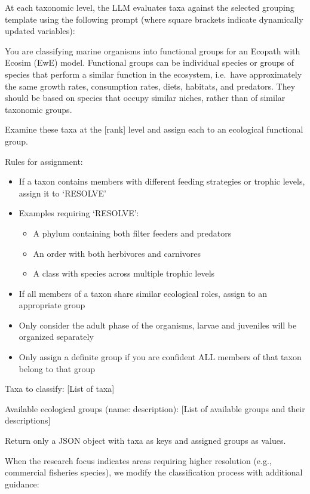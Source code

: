 At each taxonomic level, the LLM evaluates taxa against the selected grouping template using the following prompt (where square brackets indicate dynamically updated variables):

\begin{prompt}
You are classifying marine organisms into functional groups for an Ecopath with Ecosim (EwE) model. Functional groups can be individual species or groups of species that perform a similar function in the ecosystem, i.e.\ have approximately the same growth rates, consumption rates, diets, habitats, and predators. They should be based on species that occupy similar niches, rather than of similar taxonomic groups.

Examine these taxa at the [rank] level and assign each to an ecological functional group.

Rules for assignment:
\begin{itemize}
\item If a taxon contains members with different feeding strategies or trophic levels, assign it to `RESOLVE'
\item Examples requiring `RESOLVE':
  \begin{itemize}
  \item A phylum containing both filter feeders and predators
  \item An order with both herbivores and carnivores
  \item A class with species across multiple trophic levels
  \end{itemize}
\item If all members of a taxon share similar ecological roles, assign to an appropriate group
\item Only consider the adult phase of the organisms, larvae and juveniles will be organized separately
\item Only assign a definite group if you are confident ALL members of that taxon belong to that group
\end{itemize}

Taxa to classify:
[List of taxa]

Available ecological groups (name: description):
[List of available groups and their descriptions]

Return only a JSON object with taxa as keys and assigned groups as values.
\end{prompt}

When the research focus indicates areas requiring higher resolution (e.g., commercial fisheries species), we modify the classification process with additional guidance:

